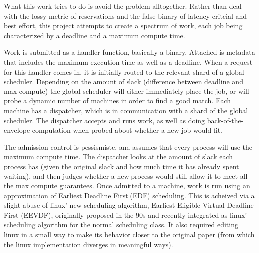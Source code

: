 What this work tries to do is avoid the problem alltogether. Rather than deal
with the lossy metric of reservations and the false binary of latency critcial
and best effort, this project attempts to create a spectrum of work, each job
being characterized by a deadline and a maximum compute time.

Work is submitted as a handler function, basically a binary. Attached is
metadata that includes the maximum execution time as well as a deadline. When a
request for this handler comes in, it is initially routed to the relevant shard
of a global scheduler. Depending on the amount of slack (difference between
deadline and max compute) the global scheduler will either immediately place the
job, or will probe a dynamic number of machines in order to find a good match.
Each machine has a dispatcher, which is in communication with a shard of the
global scheduler. The dispatcher accepts and runs work, as well as doing
back-of-the-envelope computation when probed about whether a new job would fit. 

The admission control is pessismistc, and assumes that every process will use
the maximum compute time. The dispatcher looks at the amount of slack each
process has (given the original slack and how much time it has already spent
waiting), and then judges whether a new process would still allow it to meet all
the max compute guarantees. Once admitted to a machine, work is run using an
approximation of Earliest Deadline First (EDF) scheduling. This is acheived via
a slight abuse of linux' new scheduling algorithm, Earliest Eligible Virtual
Deadline First (EEVDF), originally proposed in the 90s and recently integrated
as linux' scheduling algorithm for the normal scheduling class. It also required
editing linux in a small way to make its behavior closer to the original paper
(from which the linux implementation diverges in meaningful ways).

